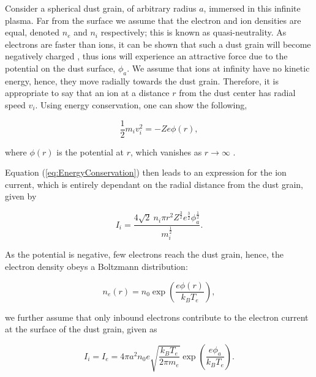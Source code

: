 \documentclass{article}
\begin{document}
\medskip

Consider a spherical dust grain, of arbitrary radius $a$, immersed in this infinite plasma. Far from the surface we assume that the electron
and ion densities are equal, denoted $n_e$ and $n_i$ respectively; this is known as quasi-neutrality. As electrons are faster than ions, it can be shown that such a dust grain will become negatively 
charged \cite{Thomas}, thus ions will experience an attractive force due to the potential on the dust surface, 
$\phi_a$. We assume that ions at infinity have no kinetic energy, hence, they move radially
towards the dust grain. Therefore, it is appropriate to say that an ion at a distance 
$r$ from the dust center has radial speed $v_i$. Using energy conservation, one can show the following,

\begin{equation}\label{eq:EnergyConservation}
\frac{1}{2} m_i v_i^2 = -Ze\phi(r),
\end{equation}

\noindent where $\phi(r)$ is the potential at $r$, which vanishes as $r \to \infty$ \cite{ABR}.

\medskip

Equation (\ref{eq:EnergyConservation}) then leads to an expression for the ion current, which is entirely dependant on the radial distance from the 
dust grain, given by

\begin{equation}\label{eq:ABRIi}
I_i = \frac{4\sqrt{2} \ n_i \pi r^2 Z^{\frac{3}{2}}e^{\frac{3}{2}} \phi_a^{\frac{1}{2}} } {m_i^{\frac{1}{2}}}.
\end{equation}

As the potential is negative, few electrons reach the dust grain, hence, the electron density obeys a Boltzmann
distribution:

\begin{equation}\label{eq:ABRed}
n_e(r) = n_0 \exp{\left(\frac{e\phi(r)}{k_B T_e}\right)},
\end{equation}

\smallskip

we further assume that only inbound electrons contribute to the electron current at the surface of the dust
grain, given as

\begin{equation}\label{eq:ABRIe}
I_i = I_e = 4 \pi a^2 n_0 e \sqrt{\frac{k_B T_e}{2 \pi m_e }} \exp{\left(\frac{e \phi_a}{k_B T_e}\right)}.
\end{equation}  
\end{document}
